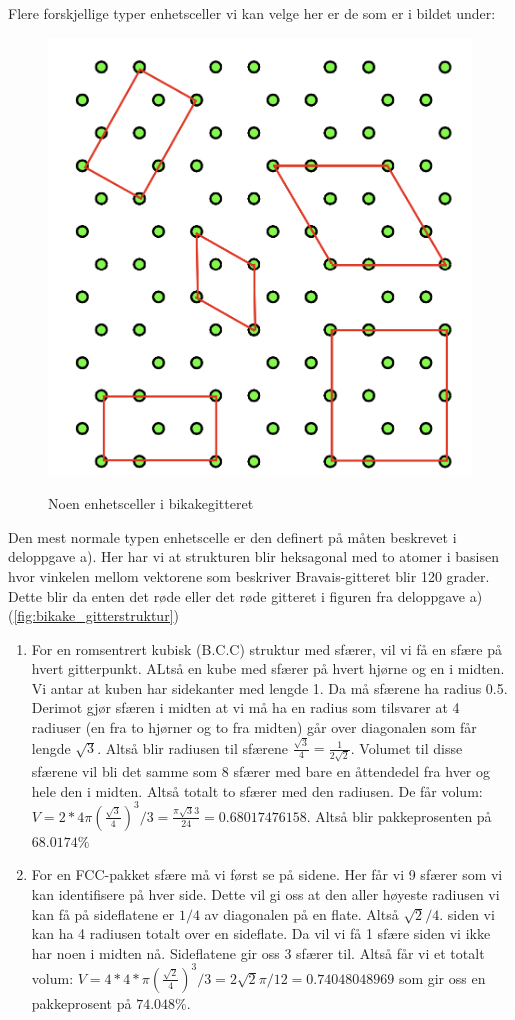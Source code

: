 \documentclass{article}
\begin{document}
Flere forskjellige typer enhetsceller vi kan velge her er de som er i bildet under:
\begin{figure}[H]
    \centering
    \includegraphics[width=0.25\linewidth]{bilder_lf/typer_enhetsceller_i_bikakegitteret.png}
    \label{fig:typer_enhetsceller_i_bikakegitteret}
    \caption{Noen enhetsceller i bikakegitteret}
\end{figure}
Den mest normale typen enhetscelle er den definert på måten beskrevet i deloppgave a). Her har vi at strukturen blir heksagonal med to atomer i basisen hvor vinkelen mellom vektorene som beskriver Bravais-gitteret blir 120 grader. Dette blir da enten det røde eller det røde gitteret i figuren fra deloppgave a) (\ref{fig:bikake_gitterstruktur})
\begin{enumerate}
    \item For en romsentrert kubisk (B.C.C) struktur med sfærer, vil vi få en sfære på hvert gitterpunkt. ALtså en kube med sfærer på hvert hjørne og en i midten. Vi antar at kuben har sidekanter med lengde 1. Da må sfærene ha radius 0.5. Derimot gjør sfæren i midten at vi må ha en radius som tilsvarer at 4 radiuser (en fra to hjørner og to fra midten) går over diagonalen som får lengde $\sqrt{3}$. Altså blir radiusen til sfærene $\frac{\sqrt{3}}{4} = \frac{1}{2 \sqrt{2}}$. Volumet til disse sfærene vil bli det samme som 8 sfærer med bare en åttendedel fra hver og hele den i midten. Altså totalt to sfærer med den radiusen. De får volum: $V = 2 * 4 \pi \left(\frac{\sqrt{3}}{4}\right)^3 / 3 = \frac{\pi \sqrt{3} 3}{24} = 0.68017476158$. Altså blir pakkeprosenten på $68.0174\%$
    \item For en FCC-pakket sfære må vi først se på sidene. Her får vi 9 sfærer som vi kan identifisere på hver side. Dette vil gi oss at den aller høyeste radiusen vi kan få på sideflatene er $1/4$ av diagonalen på en flate. Altså $\sqrt{2} / 4$. siden vi kan ha 4 radiusen totalt over en sideflate. Da vil vi få 1 sfære siden vi ikke har noen i midten nå. Sideflatene gir oss 3 sfærer til. Altså får vi et totalt volum: $V = 4 * 4 * \pi \left(\frac{\sqrt{2}}{4}\right)^3 / 3 = 2 \sqrt{2} \pi / 12 = 0.74048048969$ som gir oss en pakkeprosent på $74.048\%$.
\end{enumerate}
\end{document}
